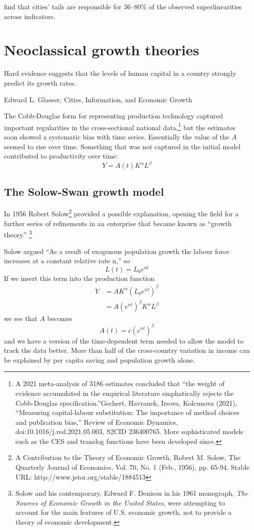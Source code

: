\cite{arvidssonUrbanScalingLaws2023} find that cities' tails are responsible for 36--80\% of the observed superlinearities across indicators. 

\section{Neoclassical growth theories} 

\label{section-growth}
\epigraph{Hard evidence suggests that the levels of human capital in a country strongly predict its growth rates.}{Edward L. Glaeser, Cities, Information, and Economic Growth}


The \gls{Cobb-Douglas} form for representing production technology captured  important regularities in the cross-sectional national data,\footnote{ A 2021 meta-analysis of 3186 estimates concluded that ``the weight of evidence accumulated in the empirical literature emphatically rejects the Cobb-Douglas specification.''Gechert, Havranek, Irsova, Kolcunova (2021), ``Measuring capital-labour substitution: The importance of method choices and publication bias,'' Review of Economic Dynamics, doi:10.1016/j.red.2021.05.003, S2CID 236400765. More sophisticated models  such as the CES and translog functions have been developed  since.} 
but the estimates soon showed a systematic bias with time series. Essentially the value of the $A$ seemed to rise over time. Something that was not captured in the initial model  contributed to productivity over time: 
 \[Y=A(t)K^\alpha L^\beta\]


 \subsection{The Solow-Swan growth model}
In 1956 Robert Solow\footnote{A Contribution to the Theory of Economic Growth,  Robert M. Solow, The Quarterly Journal of Economics, Vol. 70, No. 1 (Feb., 1956), pp. 65-94. Stable URL: http://www.jstor.org/stable/1884513} provided a possible explanation, opening the field for a further series of refinements in an enterprise that became known as ``growth theory.''
\footnote{Solow and his contemporary, Edward F. Denison in his 1961 monograph, \textit{The Sources of Economic Growth in the United States}, were attempting to account for the main features of U.S. economic growth, not to provide a theory of economic development.}%

Solow argued ``As a result of exogenous population growth the labour force increases at a constant relative rate n,'' so
  \[L(t)= L_0e^{nt}\] 
If we insert this term into the production function 
\begin{eqnarray}
Y &= AK^\alpha (L_0e^{nt})^\beta\nonumber\\
  &= A(e^{nt})^{\beta}K^\alpha L^\beta
\label{eqn-solow-swan3}
\end{eqnarray}
we see that $A$ becomes
 \[A(t)=c(e^{nt})^\beta\]
and we have a version of the time-dependent term needed to  allow the model to track the data better. More than half  of the cross-country variation in income can be explained by per capita saving and population growth alone.

